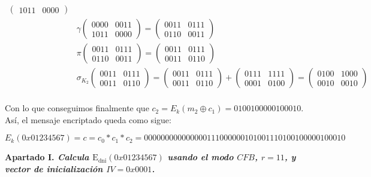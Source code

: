 \documentclass[fleqn]{article}
\begin{document}
\begin{equation*}
\begin{aligned}
\begin{pmatrix}
                1011 & 0000
            \end{pmatrix} \\
            &\gamma \begin{pmatrix}
                0000 & 0011 \\
                1011 & 0000
            \end{pmatrix} =
            \begin{pmatrix}
                0011 & 0111 \\
                0110 & 0011
            \end{pmatrix} \\
            &\pi \begin{pmatrix}
                0011 & 0111 \\
                0110 & 0011
            \end{pmatrix} =
            \begin{pmatrix}
                0011 & 0111 \\
                0011 & 0110
            \end{pmatrix} \\
            &\sigma_{K_2} \begin{pmatrix}
                0011 & 0111 \\
                0011 & 0110
            \end{pmatrix} =
            \begin{pmatrix}
                0011 & 0111 \\
                0011 & 0110
            \end{pmatrix} +
            \begin{pmatrix}
                0111 & 1111 \\
                0001 & 0100
            \end{pmatrix} =
            \begin{pmatrix}
                0100 & 1000 \\
                0010 & 0010
            \end{pmatrix} \\
        \end{aligned}
    \end{equation*}


    Con lo que conseguimos finalmente que $c_2 = E_k(m_2 \oplus c_1) = 0100100000100010$. Así, el mensaje encriptado
    queda como sigue:

    $$E_k(0x01234567) = c = c_0 * c_1 * c_2 = 000000000000000111000000101001110100100000100010$$



    \newpage
    \textbf{Apartado I. \textit{Calcula $\text{E}_{\text{dni}}(0x01234567)$ usando el modo $CFB$, $r=11$, y vector de 
            inicialización $IV = 0x0001$.}}\\
\end{document}
